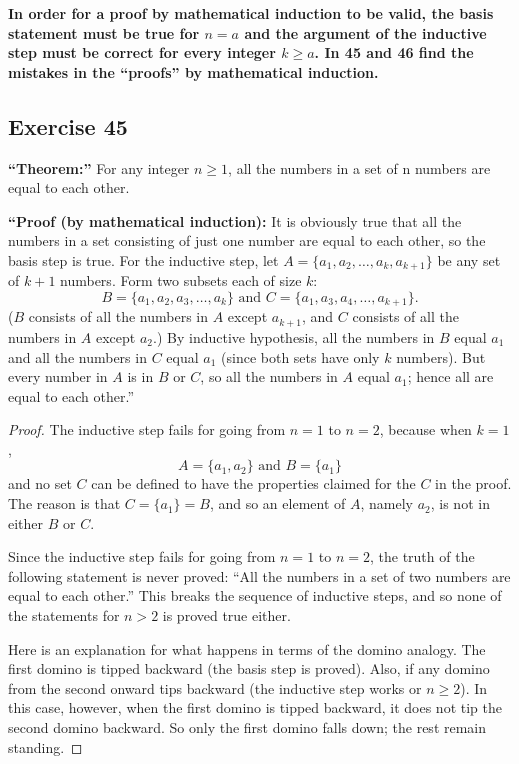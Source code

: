 \documentclass[14pt]{extarticle}
\newcommand{\cy}{\color{cyan}}
\begin{document}
{\bf \cy In order for a proof by mathematical induction to be valid, the basis statement must be true for $n = a$ and the argument of the inductive step must be correct for every integer $k \geq a$. In 45 and 46 find the mistakes in the “proofs” by mathematical induction.}

\subsection{Exercise 45}
{\bf “Theorem:”} For any integer $n \geq 1$, all the numbers in a set of n numbers are equal to each other.

    {\bf “Proof (by mathematical induction):} It is obviously true that all the numbers in a set consisting of just one number are equal to each other, so the basis step is true. For the inductive step, let $A = \{a_1, a_2, \ldots, a_k, a_{k+1}\}$ be any set of $k + 1$ numbers. Form two subsets each of size $k$:
\[
    B = \{a_1, a_2, a_3, \ldots, a_k\} \text{ and } C = \{a_1, a_3, a_4, \ldots, a_{k+1}\}.
\]
($B$ consists of all the numbers in $A$ except $a_{k+1}$, and $C$ consists of all the numbers in $A$ except $a_2$.) By inductive hypothesis, all the numbers in $B$ equal $a_1$ and all the numbers in $C$ equal $a_1$ (since both sets have only $k$ numbers). But every number in $A$ is in $B$ or $C$, so all the numbers in $A$ equal $a_1$; hence all are equal to each other.”

\begin{proof}
    The inductive step fails for going from $n = 1$ to $n = 2$,
    because when $k = 1$,
    \[
        A = \{a_1, a_2\} \text{ and } B = \{a_1\}
    \]
    and no set $C$ can be defined to have the properties claimed for the $C$ in the proof. The reason is that $C = \{a_1\} = B$, and so an element of $A$, namely $a_2$, is
    not in either $B$ or $C$.

    Since the inductive step fails for going from $n = 1$ to $n = 2$, the truth of the following statement is never proved: “All the numbers in a set of two numbers are equal to each other.” This breaks the sequence of inductive steps, and so none of the statements for $n > 2$ is proved true either.

    Here is an explanation for what happens in terms of the
    domino analogy. The first domino is tipped backward (the basis step is proved). Also, if any domino from the second onward tips backward (the inductive step works or $n \geq 2$). In this case, however, when the first domino is tipped backward, it does not tip the second domino backward. So only the first domino falls down; the rest remain standing.
\end{proof}
\end{document}
